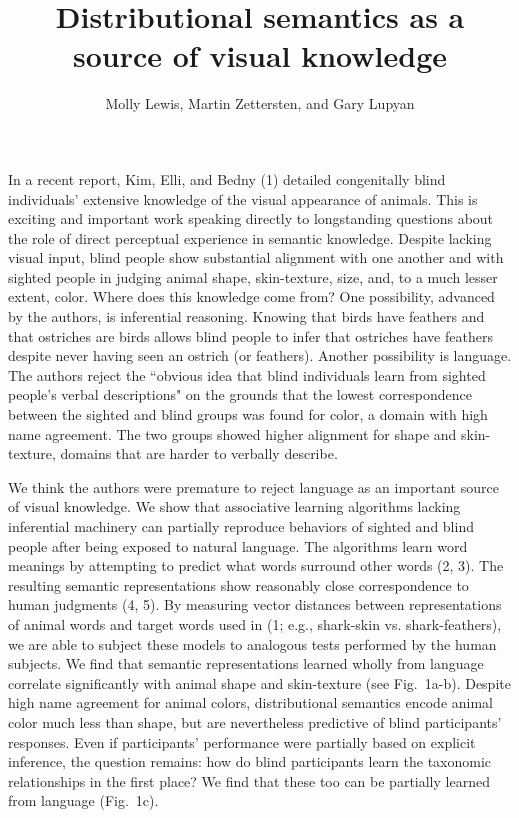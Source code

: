 \documentclass[12pt]{article}
\begin{document}
\title{\normalsize \vspace{-.5\baselineskip} \bf{Distributional semantics as a source of visual knowledge} \vspace{-1.2\baselineskip}}
\author{\small  Molly Lewis, Martin Zettersten, and Gary Lupyan}
\date{}
\clearpage\maketitle
\thispagestyle{empty}
  \small
  


 \vspace{-1\baselineskip}
 
In a recent report, Kim, Elli, and Bedny (1) detailed congenitally blind individuals’ extensive knowledge of the visual appearance of animals. This is exciting and important work speaking directly to longstanding questions about the role of direct perceptual experience in semantic knowledge. Despite lacking visual input, blind people show substantial alignment with one another and with sighted people in judging animal shape, skin-texture, size, and, to a much lesser extent, color. Where does this knowledge come from? One possibility, advanced by the authors, is inferential reasoning. Knowing that birds have feathers and that ostriches are birds allows blind people to infer that ostriches have feathers despite never having seen an ostrich (or feathers). Another possibility is language. The authors reject the ``obvious idea that blind individuals learn from sighted people's verbal descriptions" on the grounds that the lowest correspondence between the sighted and blind groups was found for color, a domain with high name agreement. The two groups showed higher alignment for shape and skin-texture, domains that are harder to verbally describe. 

We think the authors were premature to reject language as an important source of visual knowledge. We show that associative learning algorithms lacking inferential machinery can partially reproduce behaviors of sighted and blind people after being exposed to natural language. The algorithms learn word meanings by attempting to predict what words surround other words (2, 3). The resulting semantic representations show reasonably close correspondence to human judgments  (4, 5). By measuring vector distances between representations of animal words and target words used in (1; e.g., shark-skin vs. shark-feathers), we are able to subject these models to analogous tests performed by the human subjects. We find that semantic representations learned wholly from language correlate significantly with animal shape and skin-texture (see Fig.\ 1a-b). Despite high name agreement for animal colors, distributional semantics encode animal color much less than shape, but are nevertheless predictive of blind participants' responses. Even if participants’ performance were partially based on explicit inference, the question remains: how do blind participants learn the taxonomic relationships in the first place? We find that these too can be partially learned from language (Fig.\ 1c). 
\end{document}
